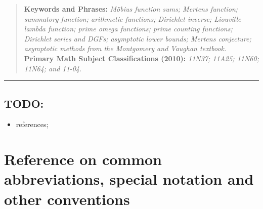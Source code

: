 \documentclass[11pt,reqno,a4letter]{article}
\numberwithin{figure}{section}
\numberwithin{table}{section}
\theoremstyle{plain}
\numberwithin{theorem}{section}
\theoremstyle{definition}
\begin{document}
\begin{abstract}
\bigskip %
\noindent
\textbf{Keywords and Phrases:} {\it M\"obius function sums; Mertens function; summatory function; 
                                    arithmetic functions; 
                                    Dirichlet inverse; Liouville lambda function; prime omega functions; 
                                    prime counting functions; Dirichlet series and DGFs; 
                                    asymptotic lower bounds; Mertens conjecture; 
                                    asymptotic methods from the Montgomery and Vaughan textbook. } \\ 
\textbf{Primary Math Subject Classifications (2010):} {\it 11N37; 11A25; 11N60; 11N64; and 11-04. } 
\end{abstract} 

\bigskip\hrule\bigskip

\subsection*{TODO: } 
\begin{itemize} 
     \item references; 
\end{itemize} 

\newpage
\section{Reference on common abbreviations, special notation and other conventions} 
\label{Appendix_Glossary_NotationConvs}
\end{document}
